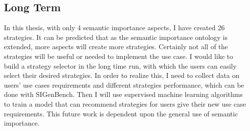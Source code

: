 \subsection{Long Term}
In this thesis, with only 4 semantic importance aspects, I have created 26 strategies.
It can be predicted that as the semantic importance ontology is extended, more aspects will create more strategies. 
Certainly not all of the strategies will be useful or needed to implement the use case. 
I would like to build a strategy selector in the long time run, with which the users can easily select their desired strategies. 
In order to realize this, I need to collect data on users' use cases requirements and different strategies performance, which can be done with SIGenBench.
Then I will use supervised machine learning algorithms to train a model that can recommend strategies for users give their new use case requirements. 
This future work is dependent upon the general use of semantic importance. 


